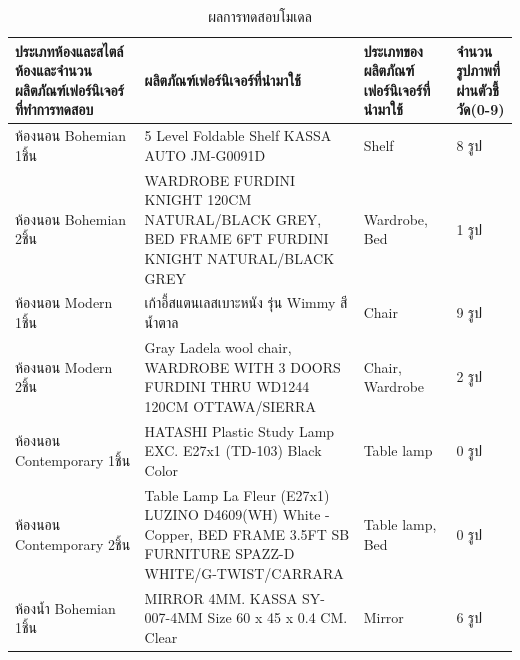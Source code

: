 \documentclass[12pt,oneside,openright,a4paper]{cpe-thai-project}
\begin{document}
\begin{table}
  \caption{ผลการทดสอบโมเดล }\label{tbl:test_model}
  \begin{tabular}{|p{2.5cm}|p{5cm}|p{3cm}|p{3cm}|}
    \hline
    \textbf{ประเภทห้องและสไตล์ห้องและจำนวนผลิตภัณฑ์เฟอร์นิเจอร์ที่ทำการทดสอบ} & \textbf{ผลิตภัณฑ์เฟอร์นิเจอร์ที่นำมาใช้}                                                                                          & \textbf{ประเภทของผลิตภัณฑ์เฟอร์นิเจอร์ที่นำมาใช้} & \textbf{จำนวนรูปภาพที่ผ่านตัวชี้วัด(0-9)} \\
    \hline
    ห้องนอน Bohemian 1ชิ้น                                          & 5 Level Foldable Shelf KASSA AUTO JM-G0091D                                                                             & Shelf                                   & 8 รูป                             \\
    \hline
    ห้องนอน Bohemian 2ชิ้น                                          & WARDROBE FURDINI KNIGHT 120CM NATURAL/BLACK GREY, BED FRAME 6FT FURDINI KNIGHT NATURAL/BLACK GREY                       & Wardrobe, Bed                           & 1 รูป                             \\
    \hline
    ห้องนอน Modern 1ชิ้น                                            & เก้าอี้สแตนเลสเบาะหนัง รุ่น Wimmy สีน้ำตาล                                                                                       & Chair                                   & 9 รูป                             \\
    \hline
    ห้องนอน Modern 2ชิ้น                                            & Gray Ladela wool chair, WARDROBE WITH 3 DOORS FURDINI THRU WD1244 120CM OTTAWA/SIERRA                                   & Chair, Wardrobe                         & 2 รูป                             \\
    \hline
    ห้องนอน Contemporary 1ชิ้น                                      & HATASHI Plastic Study Lamp EXC. E27x1 (TD-103) Black Color                                                              & Table lamp                              & 0 รูป                             \\
    \hline
    ห้องนอน Contemporary 2ชิ้น                                      & Table Lamp La Fleur (E27x1) LUZINO D4609(WH) White - Copper, BED FRAME 3.5FT SB FURNITURE SPAZZ-D WHITE/G-TWIST/CARRARA & Table lamp, Bed                         & 0 รูป                             \\
    \hline
    ห้องน้ำ Bohemian 1ชิ้น                                            & MIRROR 4MM. KASSA SY-007-4MM Size 60 x 45 x 0.4 CM. Clear                                                               & Mirror                                  & 6 รูป                             \\

\end{tabular}
\end{table}
\end{document}
